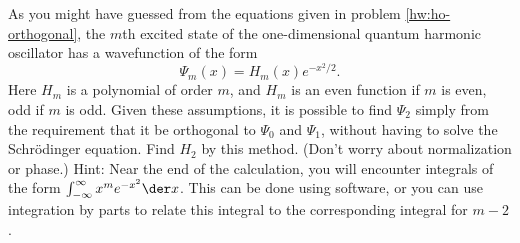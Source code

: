 As you might have guessed from the equations given in problem \ref{hw:ho-orthogonal},
the $m$th excited state of the one-dimensional quantum harmonic oscillator has
a wavefunction of the form
\begin{equation*}
  \Psi_m(x)=H_m(x)e^{-x^2/2}.
\end{equation*}
Here $H_m$ is a polynomial of order $m$, and $H_m$ is an even function if $m$ is
even, odd if $m$ is odd. Given these assumptions, it is possible to find $\Psi_2$
simply from the requirement that it be orthogonal to $\Psi_0$ and $\Psi_1$, without
having to solve the Schr\"{o}dinger equation. Find $H_2$ by this method. (Don't worry
about normalization or phase.)
Hint: Near the end of the calculation, you will encounter integrals of the form
$\int_{-\infty}^{\infty}x^m e^{-x^2}\der x$. This can be done using software, or
you can use integration by parts to relate this integral to the corresponding integral
for $m-2$.\answercheck
